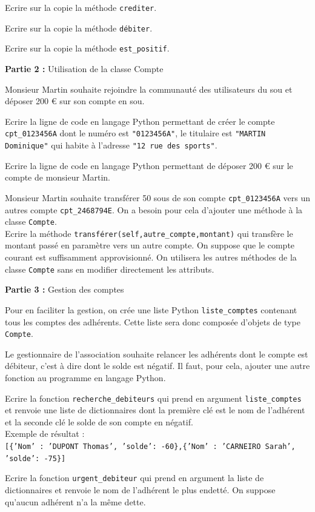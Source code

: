 \documentclass[11pt,a4paper]{article}
\begin{document}
\QListe
\item Ecrire sur la copie la méthode {\tt crediter}.
\item Ecrire sur la copie la méthode {\tt débiter}.
\item Ecrire sur la copie la méthode {\tt est\_positif}.
\FinListe

\medskip
\textbf{Partie 2 :} Utilisation de la classe Compte

Monsieur Martin souhaite rejoindre la communauté des utilisateurs du sou et déposer 200 \euro{} sur son compte en sou.

\QListe
\item Ecrire la ligne de code en langage Python permettant de créer le compte {\tt cpt\_0123456A} dont le numéro est {\tt "0123456A"}, le titulaire est {\tt "MARTIN Dominique"} qui habite à l'adresse {\tt "12 rue des sports"}.
\item Ecrire la ligne de code en langage Python permettant de déposer 200 \euro{} sur le compte de monsieur Martin.
\item Monsieur Martin souhaite transférer 50 sous de son compte {\tt cpt\_0123456A} vers un autres compte {\tt cpt\_2468794E}. On a besoin pour cela d'ajouter une méthode à la classe {\tt Compte}. \\
Ecrire la méthode {\tt transférer(self,autre\_compte,montant)} qui transfère le montant passé en paramètre vers un autre compte. On suppose que le compte courant est suffisamment approvisionné. On utilisera les autres méthodes de la classe {\tt Compte} sans en modifier directement les attributs.
\FinListe

\medskip
\textbf{Partie 3 :} Gestion des comptes

Pour en faciliter la gestion, on crée une liste Python {\tt liste\_comptes} contenant tous les comptes des adhérents. Cette liste sera donc composée d'objets de type {\tt Compte}.

\medskip
Le gestionnaire de l'association souhaite relancer les adhérents dont le compte est débiteur, c'est à dire dont le solde est négatif. Il faut, pour cela, ajouter une autre fonction au programme en langage Python.

\QListe
\item Ecrire la fonction {\tt recherche\_debiteurs} qui prend en argument {\tt liste\_comptes} et renvoie une liste de dictionnaires dont la première clé est le nom de l'adhérent et la seconde clé le solde de son compte en négatif.\\
Exemple de résultat : \\
{\tt [\{'Nom' : 'DUPONT Thomas', 'solde': -60\},\{'Nom' : 'CARNEIRO Sarah', 'solde': -75\}]}
\item Ecrire la fonction {\tt urgent\_debiteur} qui prend en argument la liste de dictionnaires et renvoie le nom de l'adhérent le plus endetté. On suppose qu'aucun adhérent n'a la même dette.
\FinListe
\separateur
\end{document}
